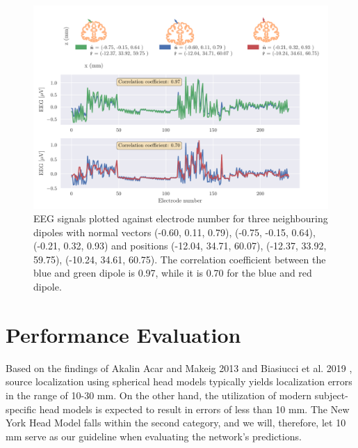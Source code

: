 \documentclass[a4paper, UKenglish, 11pt]{uiomaster}
\begin{document}

\begin{figure}[!htb]
    \centering
    \includegraphics[width=\linewidth]{figures/compare_dipoles.pdf}
    \caption{EEG signals plotted against electrode number for three neighbouring dipoles with normal vectors (-0.60, 0.11, 0.79), (-0.75, -0.15, 0.64), (-0.21, 0.32, 0.93) and positions (-12.04, 34.71, 60.07), (-12.37, 33.92, 59.75), (-10.24, 34.61, 60.75). The correlation coefficient between the blue and green dipole is 0.97, while it is 0.70 for the blue and red dipole. }
    \label{fig:neighbour_dipoles}
\end{figure}

\FloatBarrier

\section{Performance Evaluation} \label{sec:performace_evaluatoin}
Based on the findings of Akalin Acar and Makeig 2013 \cite{akalin2013effects} and Biasiucci et al. 2019 \cite{biasiucci2019electroencephalography}, source localization using spherical head models typically yields localization errors in the range of 10-30 mm. On the other hand, the utilization of modern subject-specific head models is expected to result in errors of less than 10 mm. The New York Head Model falls within the second category, and we will, therefore, let 10 mm serve as our guideline when evaluating the network's predictions.
\end{document}

